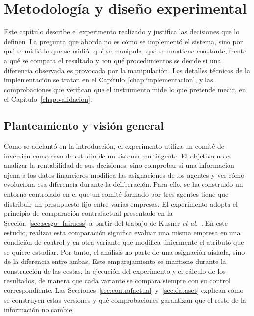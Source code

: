 

\chapter{Metodología y diseño experimental}
\label{chap:metodologia}

Este capítulo describe el experimento realizado y justifica las decisiones que lo definen. La pregunta que aborda no es cómo se implementó el sistema, sino por qué se midió lo que se midió: qué se manipula, qué se mantiene constante, frente a qué se compara el resultado y con qué procedimientos se decide si una diferencia observada es provocada por la manipulación. Los detalles técnicos de la implementación se tratan en el Capítulo~\ref{chap:implementacion}, y las comprobaciones que verifican que el instrumento mide lo que pretende medir, en el Capítulo~\ref{chap:validacion}.

\section{Planteamiento y visión general}
\label{sec:metodologia_planteamiento}

Como se adelantó en la introducción, el experimento utiliza un comité de inversión como caso de estudio de un sistema multiagente. El objetivo no es analizar la rentabilidad de sus decisiones, sino comprobar si una información ajena a los datos financieros modifica las asignaciones de los agentes y ver cómo evoluciona esa diferencia durante la deliberación. Para ello, se ha construido un entorno controlado en el que un comité formado por tres agentes tiene que distribuir un presupuesto fijo entre varias empresas. El experimento adopta el principio de comparación contrafactual presentado en la Sección~\ref{sec:sesgo_fairness} a partir del trabajo de Kusner \textit{et al.}~\cite{kusner2017counterfactual}. En este estudio, realizar esta comparación significa evaluar una misma empresa en una condición de control y en otra variante que modifica únicamente el atributo que se quiere estudiar. Por tanto, el análisis no parte de una asignación aislada, sino de la diferencia entre ambas. Este emparejamiento se mantiene durante la construcción de las cestas, la ejecución del experimento y el cálculo de los resultados, de manera que cada variante se compara siempre con su control correspondiente. Las Secciones~\ref{sec:contrafactual} y~\ref{sec:dataset} explican cómo se construyen estas versiones y qué comprobaciones garantizan que el resto de la información no cambie.

